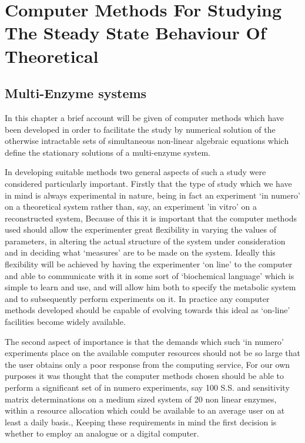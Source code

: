 

\chapter{Computer Methods For Studying The Steady State Behaviour Of Theoretical}

\section{Multi-Enzyme systems}

In this chapter a brief account will be given of computer methods which have been developed in order to facilitate the study by numerical solution of the otherwise intractable sets of simultaneous non-linear algebraic equations which define the stationary solutions of a multi-enzyme system.

In developing suitable methods two general aspects of such a study were considered particularly important. Firstly that the type of study which we have in mind is always experimental in nature, being in fact an experiment `in numero' on a theoretical system rather than, say, an experiment 'in vitro' on a reconstructed system, Because of this it is important that the computer methods used should allow the experimenter great flexibility in varying the values of parameters, in altering the actual structure of the system under consideration and in deciding what `measures' are to be made on the system. Ideally this flexibility will be achieved by having the experimenter `on line' to the computer and able to communicate with it in some sort of `biochemical language' which is simple to learn and use, and will allow him both to specify the metabolic system and to subsequently perform experiments on it. In practice any computer methods developed should be capable of evolving towards this ideal as `on-line' facilities become widely available.

The second aspect of importance is that the demands which such `in numero' experiments place on the available computer resources should not be so large that the user obtains only a poor response from the computing service, For our own purposes it was thought that the computer methods chosen should be able to perform a significant set of in numero experiments, say 100 S.S. and sensitivity matrix determinations on a medium sized system of 20 non linear enzymes, within a resource allocation which could be available to an average user on at least a daily basis.,
Keeping these requirements in mind the first decision is whether to employ an analogue or a digital computer.

